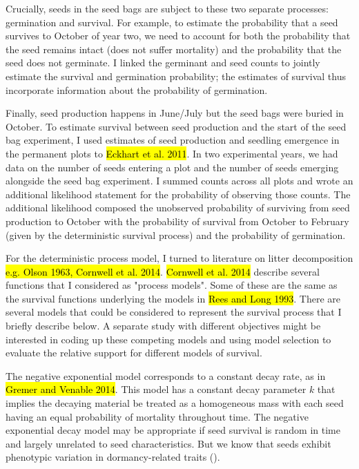 \documentclass[12pt, oneside, titlepage]{article}   	%
\begin{document}
Crucially, seeds in the seed bags are subject to these two separate processes: germination and survival. For example, to estimate the probability that a seed survives to October of year two, we need to account for both the probability that the seed remains intact (does not suffer mortality) and the probability that the seed does not germinate. I linked the germinant and seed counts to jointly estimate the survival and germination probability; the estimates of survival thus incorporate information about the probability of germination. 

Finally, seed production happens in June/July but the seed bags were buried in October. To estimate survival between seed production and the start of the seed bag experiment, I used estimates of seed production and seedling emergence in the permanent plots to \hl{Eckhart et al. 2011}. In two experimental years, we had data on the number of seeds entering a plot and the number of seeds emerging alongside the seed bag experiment. I summed counts across all plots and wrote an additional likelihood statement for the probability of observing those counts. The additional likelihood composed the unobserved probability of surviving from seed production to October with the probability of survival from October to February (given by the deterministic survival process) and the probability of germination. 

 For the deterministic process model, I turned to literature on litter decomposition \hl{e.g. Olson 1963, Cornwell et al. 2014}. \hl{Cornwell et al. 2014} describe several functions that I considered as "process models". Some of these are the same as the survival functions underlying the models in \hl{Rees and Long 1993}. There are several models that could be considered to represent the survival process that I briefly describe below. A separate study with different objectives might be interested in coding up these competing models and using model selection to evaluate the relative support for different models of survival. 

The negative exponential model corresponds to a constant decay rate, as in \hl{Gremer and Venable 2014}. This model has a constant decay parameter $k$ that implies the decaying material be treated as a homogeneous mass with each seed having an equal probability of mortality throughout time. The negative exponential decay model may be appropriate if seed survival is random in time and largely unrelated to seed characteristics. But we know that seeds exhibit phenotypic variation in dormancy-related traits (\cite{lonsdale1988}).
\end{document}
